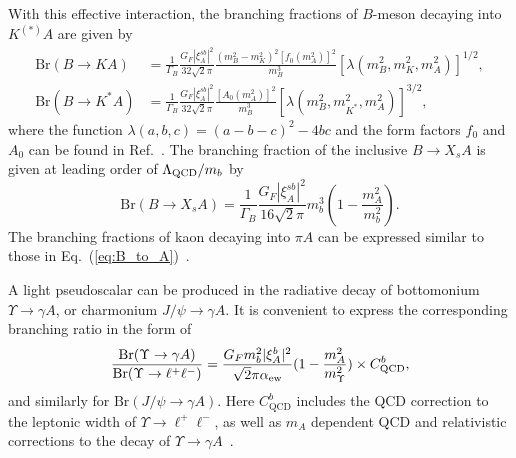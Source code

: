 \documentclass[letterpaper,11pt]{article}
\begin{document}
\begin{description}
With this effective interaction, the branching fractions of $B$-meson decaying into $K^{(*)}A$ are given by~\cite{Freytsis:2009ct}  
\begin{align}
    \text{Br}(B\rightarrow KA) 
    &=\frac{1}{\Gamma_B}\frac{G_F|\xi_A^{sb}|^2}{32\sqrt{2}\pi}\frac{(m_B^2-m_K^2)^2\left[f_0(m_{A}^2)\right]^2}{m_B^3}\left[\lambda(m_B^2, m_K^2, m_A^2)\right]^{1/2},   \label{eq:B_to_A}\\
    \text{Br}(B\rightarrow K^*A)& 
    =\frac{1}{\Gamma_B}\frac{G_F|\xi_A^{sb}|^2}{32\sqrt{2}\pi}\frac{\left[A_0(m_{A}^2)\right]^2}{m_B^3}\left[\lambda(m_B^2, m_{K^*}^2, m_A^2)\right]^{3/2},  
\end{align}
 where the function $\lambda(a,b,c)=(a-b-c)^2-4bc$ and the form factors $f_0$ and $A_0$ can be found in Ref.~\cite{Ali:1999mm}.  The branching fraction of the inclusive $B\to X_s A$ is given at leading order of $\Lambda_{\rm QCD}/m_b$ by~\cite{Freytsis:2009ct}
\begin{equation}
    \text{Br}(B\rightarrow X_s A) 
    =\frac{1}{\Gamma_B}\frac{G_F|\xi_A^{sb}|^2}{16\sqrt{2}\pi}m_b^3\left(1-\frac{m_A^2}{m_b^2}\right).
\end{equation}
The branching fractions of kaon decaying into $\pi A$ can be expressed similar to those in Eq.~(\ref{eq:B_to_A})~\cite{Dolan:2014ska}.
 

\item[Radiative Bottomonium $\Upsilon$ and Charmonium $J/ \psi$ decays]
 
 A light pseudoscalar can be produced in the radiative decay of bottomonium $\Upsilon\rightarrow\gamma A$, or charmonium $J/ \psi \rightarrow\gamma A$. It is convenient to express the corresponding branching ratio in the form of~\cite{Winkler:2018qyg,BESIII:2021ges,Domingo:2010am}  
\begin{equation}
    \frac{\text{Br}({\Upsilon\rightarrow\gamma A})}{\text{Br}({\Upsilon\rightarrow \ell^+\ell^-})}=\frac{ G_F m_b^2|{\xi_A^b}|^2}{\sqrt{2}\pi\alpha_{\rm ew}}(1-\frac{m_A^2}{m_\Upsilon^2})\times C_{\text{QCD}}^b,
\end{equation}
and similarly for $\text{Br}({J/\psi\rightarrow\gamma A})$.
Here  $C_{\text{QCD}}^{b}$ includes the QCD correction to the leptonic width of ${\Upsilon\rightarrow \ell^+\ell^-}$, as well as $m_A$ dependent QCD and relativistic corrections to the decay of ${\Upsilon\rightarrow\gamma A}$~\cite{Drewes:2015iva,Beneke:1997jm,McKeen:2008gd}.  
\end{description}
\end{document}
